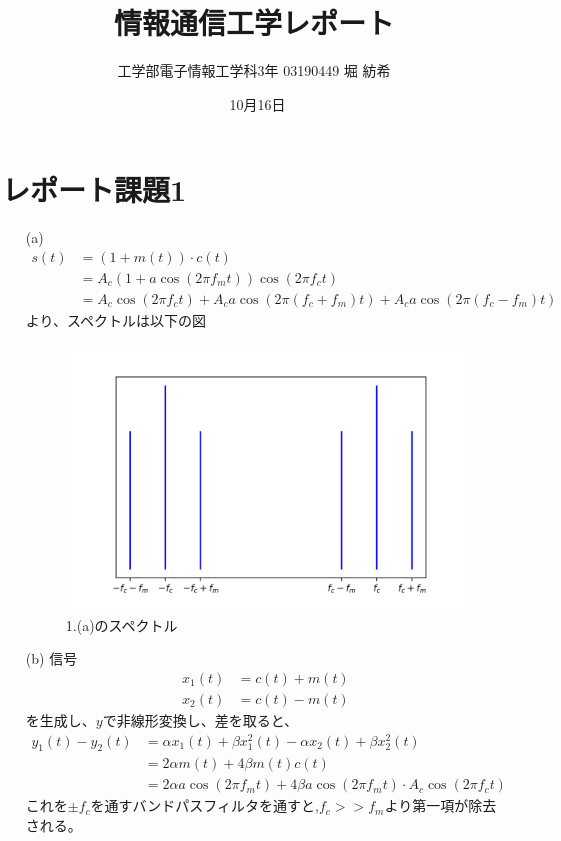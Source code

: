 \documentclass[dvipdfmx]{jsarticle}
\begin{document}
\title{情報通信工学レポート}
\author{工学部電子情報工学科3年 03190449  堀 紡希}
\date{\ 10月16日}
\maketitle

\section*{レポート課題1}

\begin{enumerate}
\item[(a)]
\begin{align*}
s(t) &= \left(1+m(t)\right)\cdot c(t)\\
&= A_{c}\left(1+a\cos{(2\pi f_{m}t)}\right)\cos{(2\pi f_{c}t)}\\
&= A_{c}\cos{(2\pi f_{c}t)} + A_{c}a\cos{(2\pi (f_{c}+f_{m})t)} + A_{c}a\cos{(2\pi (f_{c}-f_{m})t)}
\end{align*}
より、スペクトルは以下の図

\begin{center}
\begin{figure}[H]
\includegraphics[scale = 1]{3_1.png}
\caption{1.(a)のスペクトル}
\end{figure}
\end{center}

\item[(b)]
信号
\begin{align*}
x_{1}(t) &= c(t) + m(t)\\
x_{2}(t) &= c(t) - m(t)
\end{align*}
を生成し、$y$で非線形変換し、差を取ると、
\begin{align*}
y_{1}(t) - y_{2}(t) &= \alpha x_{1}(t) + \beta x_{1}^{2}(t) - \alpha x_{2}(t) + \beta x_{2}^{2}(t)\\
&= 2\alpha m(t) + 4\beta m(t)c(t)\\
&= 2\alpha a\cos{(2\pi f_{m}t)} + 4\beta a\cos{(2\pi f_{m}t)}\cdot A_{c}\cos{(2\pi f_{c}t)}
\end{align*}
これを$\pm f_{c}$を通すバンドパスフィルタを通すと,$f_{c}>>f_{m}$より第一項が除去される。


\end{enumerate}
\end{document}
